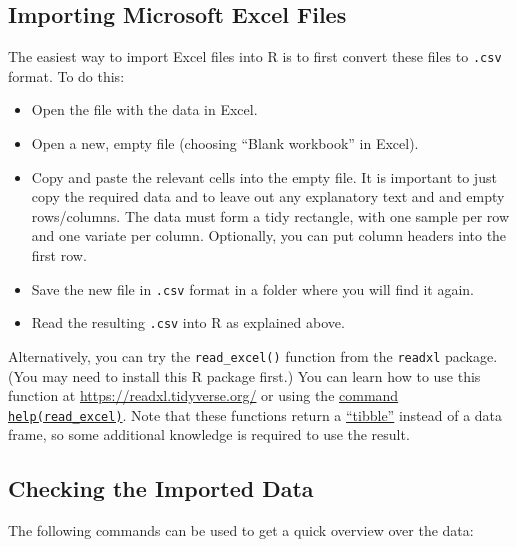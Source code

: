 \documentclass[
  a4paper,
]{article}
\theoremstyle{definition}
\theoremstyle{definition}
\theoremstyle{definition}
\theoremstyle{definition}
\theoremstyle{remark}
\begin{document}
\subsection*{Importing Microsoft Excel Files}\label{importing-microsoft-excel-files}

The easiest way to import Excel files into R is to first convert these
files to \texttt{.csv} format. To do this:

\begin{itemize}
\item
  Open the file with the data in Excel.
\item
  Open a new, empty file (choosing ``Blank workbook'' in Excel).
\item
  Copy and paste the relevant cells into the empty file. It is
  important to just copy the required data and to leave out any
  explanatory text and and empty rows/columns. The data must form a
  tidy rectangle, with one sample per row and one variate per
  column. Optionally, you can put column headers into the first row.
\item
  Save the new file in \texttt{.csv} format
  in a folder where you will find it again.
\item
  Read the resulting \texttt{.csv} into R as explained above.
\end{itemize}

Alternatively, you can try the \texttt{read\_excel()} function from the \texttt{readxl}
package. (You may need to install this R package first.) You can learn how to
use this function at
\url{https://readxl.tidyverse.org/} or using the
\href{https://rdrr.io/cran/readxl/man/read_excel.html}{command \texttt{help(read\_excel)}}.
Note that these functions return a \href{https://tibble.tidyverse.org/}{``tibble''}
instead of a data frame, so some additional knowledge is required to use the
result.

\subsection*{Checking the Imported Data}\label{checking-the-imported-data}

The following commands can be used to get a quick overview over the data:
\end{document}
